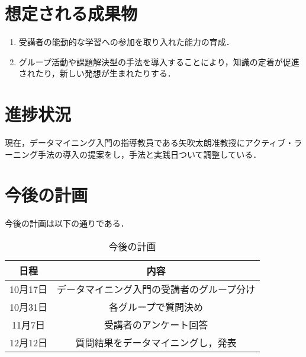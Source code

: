 \documentclass[uplatex,twocolumn,dvipdfmx]{jsarticle}
\begin{document}
\section{想定される成果物}

\begin{enumerate}

\item 受講者の能動的な学習への参加を取り入れた能力の育成．
\item グループ活動や課題解決型の手法を導入することにより，知識の定着が促進されたり，新しい発想が生まれたりする．

\end{enumerate}


\section{進捗状況}

現在，データマイニング入門の指導教員である矢吹太朗准教授にアクティブ・ラーニング手法の導入の提案をし，手法と実践日ついて調整している．



\section{今後の計画}

今後の計画は以下の通りである．
\begin{table}[hbtp]
  \caption{今後の計画}
  \label{table:data_type}
  \centering
  \begin{tabular}{cc}
    \hline
    日程 & 内容  \\ \hline \hline
    10月17日 & データマイニング入門の受講者のグループ分け \\
    10月31日 & 各グループで質問決め \\
    11月7日 & 受講者のアンケート回答 \\
    12月12日 & 質問結果をデータマイニングし，発表 \\
 \hline
  \end{tabular}
\end{table}


\end{document}

